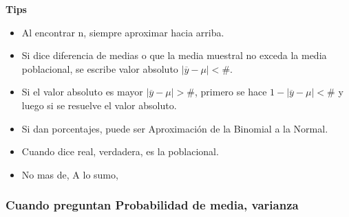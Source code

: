 \textbf{Tips}
\begin{itemize}
	\item Al encontrar n, siempre aproximar hacia arriba.
	\item Si dice diferencia de medias o que la media muestral no exceda la media poblacional, se escribe valor absoluto $|\overline{y}-\mu|<\#$.
	\item Si el valor absoluto es mayor $|\overline{y}-\mu|>\#$, primero se hace $1-|\overline{y}-\mu|<\#$ y luego si se resuelve el valor absoluto.
	\item Si dan porcentajes, puede ser Aproximación de la Binomial a la Normal.
	\item Cuando dice real, verdadera, es la poblacional.
	\item No mas de, A lo sumo, 
\end{itemize}





\subsubsection{Cuando preguntan Probabilidad de media, varianza}

